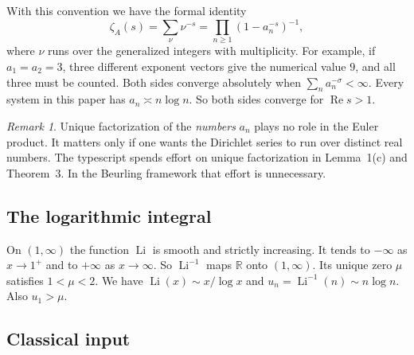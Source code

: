 \documentclass[12pt,letterpaper]{article}
\theoremstyle{definition}
\theoremstyle{remark}
\newtheorem{remark}[theorem]{Remark}
\newcommand{\Li}{\operatorname{Li}}
\newcommand{\Ree}{\operatorname{Re}}
\newcommand{\RR}{\mathbb{R}}
\begin{document}
With this convention we have the formal identity
\[
\zeta_A(s)=\sum_{\nu}\nu^{-s}=\prod_{n\ge1}(1-a_n^{-s})^{-1},
\]
where $\nu$ runs over the generalized integers with multiplicity. For example, if $a_1=a_2=3$, three different exponent vectors give the
numerical value $9$, and all three must be counted.
Both sides converge absolutely when $\sum_n a_n^{-\sigma}<\infty$. Every system
in this paper has $a_n\asymp n\log n$. So both sides converge for
$\Ree s>1$.

\begin{remark}\label{rem:UF}
Unique factorization of the \emph{numbers} $a_n$ plays no role in the
Euler product. It matters only if one wants the Dirichlet series to run
over distinct real numbers. The typescript spends effort on unique
factorization in Lemma~1(c) and Theorem~3. In the Beurling framework that
effort is unnecessary.
\end{remark}

\subsection{The logarithmic integral}

On $(1,\infty)$ the function $\Li$ is smooth and strictly increasing. It
tends to $-\infty$ as $x\to1^+$ and to $+\infty$ as $x\to\infty$. So
$\Li^{-1}$ maps $\RR$ onto $(1,\infty)$. Its unique zero $\mu$ satisfies
$1<\mu<2$. We have $\Li(x)\sim x/\log x$ and $u_n=\Li^{-1}(n)\sim n\log n$.
Also $u_1>\mu$.

\subsection{Classical input}
\end{document}
